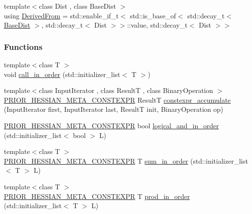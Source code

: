 \begin{DoxyCompactItemize}
\item 
{\footnotesize template$<$class Dist , class Base\+Dist $>$ }\\using \hyperlink{namespaceprior__hessian_1_1meta_a7dcd55f8c696cfac1fe7872289c4d3e1}{Derived\+From} = std\+::enable\+\_\+if\+\_\+t$<$ std\+::is\+\_\+base\+\_\+of$<$ std\+::decay\+\_\+t$<$ \hyperlink{classprior__hessian_1_1BaseDist}{Base\+Dist} $>$, std\+::decay\+\_\+t$<$ Dist $>$$>$\+::value, std\+::decay\+\_\+t$<$ Dist $>$$>$
\end{DoxyCompactItemize}
\subsubsection*{Functions}
\begin{DoxyCompactItemize}
\item 
{\footnotesize template$<$class T $>$ }\\void \hyperlink{namespaceprior__hessian_1_1meta_a179314ad7ba735849c4095e735374ab2}{call\+\_\+in\+\_\+order} (std\+::initializer\+\_\+list$<$ T $>$)
\item 
{\footnotesize template$<$class Input\+Iterator , class ResultT , class Binary\+Operation $>$ }\\\hyperlink{Meta_8h_a4f9105f0c435f5a50cc6000252e92575}{P\+R\+I\+O\+R\+\_\+\+H\+E\+S\+S\+I\+A\+N\+\_\+\+M\+E\+T\+A\+\_\+\+C\+O\+N\+S\+T\+E\+X\+PR} ResultT \hyperlink{namespaceprior__hessian_1_1meta_a8dd1d78533f7011bebda7009c0591041}{constexpr\+\_\+accumulate} (Input\+Iterator first, Input\+Iterator last, ResultT init, Binary\+Operation op)
\item 
\hyperlink{Meta_8h_a4f9105f0c435f5a50cc6000252e92575}{P\+R\+I\+O\+R\+\_\+\+H\+E\+S\+S\+I\+A\+N\+\_\+\+M\+E\+T\+A\+\_\+\+C\+O\+N\+S\+T\+E\+X\+PR} bool \hyperlink{namespaceprior__hessian_1_1meta_add11951e7edc2c231ca52c32ac0ee07b}{logical\+\_\+and\+\_\+in\+\_\+order} (std\+::initializer\+\_\+list$<$ bool $>$ L)
\item 
{\footnotesize template$<$class T $>$ }\\\hyperlink{Meta_8h_a4f9105f0c435f5a50cc6000252e92575}{P\+R\+I\+O\+R\+\_\+\+H\+E\+S\+S\+I\+A\+N\+\_\+\+M\+E\+T\+A\+\_\+\+C\+O\+N\+S\+T\+E\+X\+PR} T \hyperlink{namespaceprior__hessian_1_1meta_ab09470f06d05f5c58e249a03ef19242f}{sum\+\_\+in\+\_\+order} (std\+::initializer\+\_\+list$<$ T $>$ L)
\item 
{\footnotesize template$<$class T $>$ }\\\hyperlink{Meta_8h_a4f9105f0c435f5a50cc6000252e92575}{P\+R\+I\+O\+R\+\_\+\+H\+E\+S\+S\+I\+A\+N\+\_\+\+M\+E\+T\+A\+\_\+\+C\+O\+N\+S\+T\+E\+X\+PR} T \hyperlink{namespaceprior__hessian_1_1meta_a32068030d513a09bf78340f87be83639}{prod\+\_\+in\+\_\+order} (std\+::initializer\+\_\+list$<$ T $>$ L)
\end{DoxyCompactItemize}


